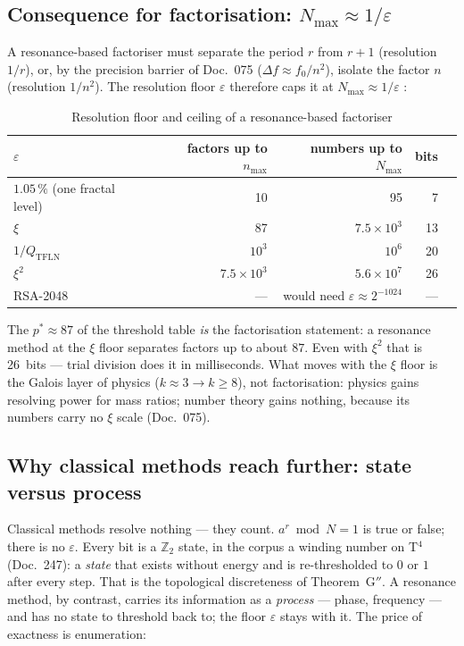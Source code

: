 \subsection{Consequence for factorisation: $N_\mathrm{max} \approx 1/\varepsilon$}

A resonance-based factoriser must separate the period $r$ from $r{+}1$
(resolution $1/r$), or, by the precision barrier of Doc.~075
($\Delta f \approx f_0/n^2$), isolate the factor $n$ (resolution $1/n^2$).
The resolution floor $\varepsilon$ therefore caps it at $N_\mathrm{max}\approx1/\varepsilon$ \BM:

\begin{table}[H]
\centering
\caption{Resolution floor and ceiling of a resonance-based factoriser}
\begin{tabular}{lrrrr}
\toprule
$\varepsilon$ & factors up to $n_\mathrm{max}$ & numbers up to $N_\mathrm{max}$ & bits \\
\midrule
$1.05\,\%$ (one fractal level) & 10 & 95 & 7 \\
$\xi$ & 87 & $7.5\times10^{3}$ & 13 \\
$1/Q_\mathrm{TFLN}$ & $10^3$ & $10^{6}$ & 20 \\
$\xi^2$ & $7.5\times10^3$ & $5.6\times10^{7}$ & 26 \\
RSA-2048 & --- & would need $\varepsilon\approx2^{-1024}$ & --- \\
\bottomrule
\end{tabular}
\end{table}

The $p^*\approx87$ of the threshold table \emph{is} the factorisation statement:
a resonance method at the $\xi$ floor separates factors up to about $87$. Even
with $\xi^2$ that is 26~bits --- trial division does it in milliseconds. What
moves with the $\xi$ floor is the Galois layer of physics ($k\approx3\to k\geq8$),
not factorisation: physics gains resolving power for mass ratios; number theory
gains nothing, because its numbers carry no $\xi$ scale (Doc.~075).

\subsection{Why classical methods reach further: state versus process}

Classical methods resolve nothing --- they count. $a^r \bmod N = 1$ is true or
false; there is no $\varepsilon$. Every bit is a $\mathbb{Z}_2$ state, in the
corpus a winding number on T$^4$ (Doc.~247): a \emph{state} that exists without
energy and is re-thresholded to $0$ or $1$ after every step. That is the
topological discreteness of Theorem~G$''$. A resonance method, by contrast,
carries its information as a \emph{process} --- phase, frequency --- and has no
state to threshold back to; the floor $\varepsilon$ stays with it. The price of
exactness is enumeration:

